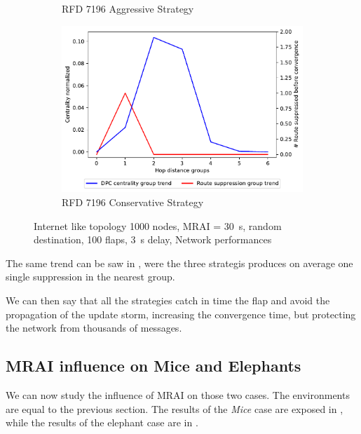 \begin{figure}[H]
\begin{subfigure}[b]{0.325\textwidth}
         \caption{RFD 7196 Aggressive Strategy}
         \label{fig:1000_7196RFDA_centVSsup_elephants}
     \end{subfigure}
     \hfill
     \begin{subfigure}[b]{0.325\textwidth}
         \centering
         \includegraphics[width=\textwidth]{images/RFD/miceVSelephants/elephants/cisco_1000_RFD_7196_conservative_nodeConvergence_centVSsup_trend.pdf}
         \caption{RFD 7196 Conservative Strategy}
         \label{fig:1000_7196RFDC_centVSsup_elephants}
     \end{subfigure}
		\caption{Internet like topology \num{1000} nodes, \ac{MRAI} = \SI{30}{\second}, random destination, \num{100} flaps, \SI{3}{\second} delay, Network performances}
        \label{fig:1000_RFD_centVSsup_elephants}
\end{figure}

The same trend can be saw in , were
the three strategis produces on average one single suppression in the nearest
group.

We can then say that all the strategies catch in time the flap and avoid the
propagation of the update storm, increasing the convergence time, but protecting 
the network from thousands of messages.

\subsection{MRAI influence on Mice and Elephants}
\label{subsec:bgp_rfd_mrai_influence_mice_elephants}

We can now study the influence of \ac{MRAI} on those two cases.
The environments are equal to the previous section.
The results of the \textit{Mice} case are exposed in ,
while the results of the elephant case are in .

